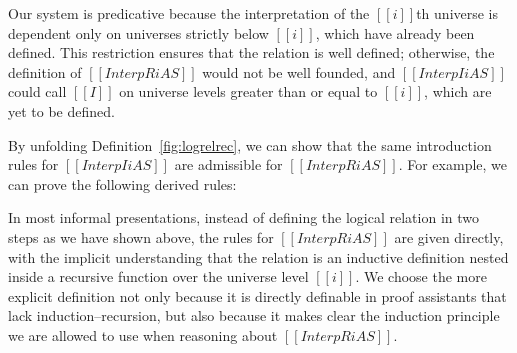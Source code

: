 \documentclass[\ifpublic nolinenum\else\fi,online,OA]{jfp}
\theoremstyle{definition}
\begin{document}
Our system is predicative because the interpretation of the $[[i]]$th universe
is dependent only on universes strictly below $[[i]]$,
which have already been defined.
This restriction ensures that the relation is well defined; otherwise, the
definition of $[[InterpR i A S]]$ would not be well founded, and
$[[Interp I i A S]]$ could call $[[I]]$ on universe levels greater than
or equal to $[[i]]$, which are yet to be defined.

By unfolding Definition~\ref{fig:logrelrec}, we can
show that the same introduction rules for $[[Interp I i A S]]$ are
admissible for $[[InterpR i A S]]$. For example, 
we can prove the following derived rules:
\begin{center}
 \qquad {}
\end{center}

In most informal presentations, instead of defining the logical
relation in two steps as we have shown above, the rules for $[[InterpR
i A S]]$ are given directly, with the implicit understanding that the
relation is an inductive definition nested inside a recursive
function over the universe level $[[i]]$. We choose
the more explicit definition not only because it is directly definable
in proof assistants that lack induction--recursion,
but also because it makes clear the induction
principle we are allowed to use when reasoning about $[[InterpR i A S]]$.

\end{document}
